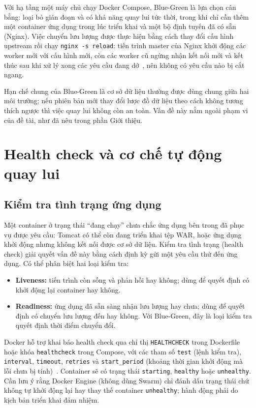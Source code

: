 \documentclass[12pt,a4paper,oneside]{extreport}
\begin{document}
Với hạ tầng một máy chủ chạy Docker Compose, Blue-Green là lựa chọn cân bằng: loại
bỏ gián đoạn và có khả năng quay lui tức thời, trong khi chỉ cần thêm một
container ứng dụng trong lúc triển khai và một bộ định tuyến đã có sẵn (Nginx).
Việc chuyển lưu lượng được thực hiện bằng cách thay đổi cấu hình upstream rồi
chạy \texttt{nginx -s reload}: tiến trình master của Nginx khởi động các worker
mới với cấu hình mới, còn các worker cũ ngừng nhận kết nối mới và kết thúc sau
khi xử lý xong các yêu cầu đang dở~\cite{nginx-control}, nên không có yêu cầu nào
bị cắt ngang.

Hạn chế chung của Blue-Green là cơ sở dữ liệu thường được dùng chung giữa hai
môi trường; nếu phiên bản mới thay đổi lược đồ dữ liệu theo cách không tương
thích ngược thì việc quay lui không còn an toàn. Vấn đề này nằm ngoài phạm vi
của đề tài, như đã nêu trong phần Giới thiệu.

\section{Health check và cơ chế tự động quay lui}
\label{sec:healthcheck}
\subsection{Kiểm tra tình trạng ứng dụng}
Một container ở trạng thái ``đang chạy'' chưa chắc ứng dụng bên trong đã phục vụ
được yêu cầu: Tomcat có thể còn đang triển khai tệp WAR, hoặc ứng dụng khởi động
nhưng không kết nối được cơ sở dữ liệu. Kiểm tra tình trạng (health check) giải
quyết vấn đề này bằng cách định kỳ gửi một yêu cầu thử đến ứng dụng. Có thể phân
biệt hai loại kiểm tra:
\begin{itemize}
  \item \textbf{Liveness:} tiến trình còn sống và phản hồi hay không; dùng để quyết
  định có khởi động lại container hay không.
  \item \textbf{Readiness:} ứng dụng đã sẵn sàng nhận lưu lượng hay chưa; dùng để
  quyết định có chuyển lưu lượng đến hay không. Với Blue-Green, đây là loại kiểm
  tra quyết định thời điểm chuyển đổi.
\end{itemize}

Docker hỗ trợ khai báo health check qua chỉ thị \texttt{HEALTHCHECK} trong
Dockerfile hoặc khóa \texttt{healthcheck} trong Compose, với các tham số
\texttt{test} (lệnh kiểm tra), \texttt{interval}, \texttt{timeout},
\texttt{retries} và \texttt{start\_period} (khoảng thời gian khởi động mà lỗi chưa
bị tính)~\cite{docker-healthcheck}. Container sẽ có trạng thái \texttt{starting},
\texttt{healthy} hoặc \texttt{unhealthy}. Cần lưu ý rằng Docker Engine (không dùng
Swarm) chỉ đánh dấu trạng thái chứ không tự khởi động lại hay thay thế container
\texttt{unhealthy}; hành động phải do kịch bản triển khai đảm nhiệm.
\end{document}
